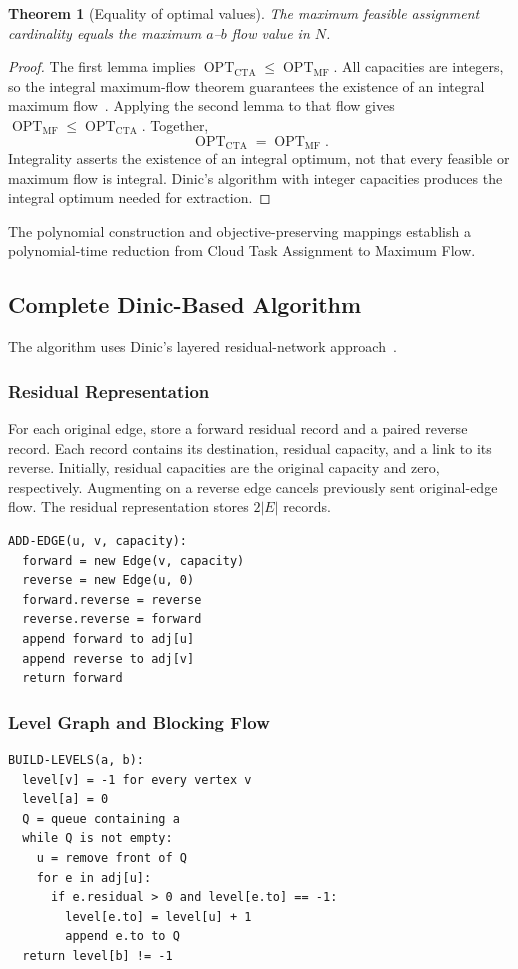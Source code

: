 \documentclass[conference]{IEEEtran}
\newtheorem{theorem}{Theorem}
\theoremstyle{definition}
\theoremstyle{remark}
\newcommand{\OPT}{\operatorname{OPT}}
\begin{document}
\begin{theorem}[Equality of optimal values]
The maximum feasible assignment cardinality equals the maximum $a$--$b$
flow value in $N$.
\end{theorem}
\begin{proof}
The first lemma implies $\OPT_{\mathrm{CTA}}\leq\OPT_{\mathrm{MF}}$.
All capacities are integers, so the integral maximum-flow theorem guarantees
the existence of an integral maximum flow~\cite{ahuja1993}. Applying the second lemma to
that flow gives $\OPT_{\mathrm{MF}}\leq\OPT_{\mathrm{CTA}}$. Together,
\begin{equation}
\boxed{\OPT_{\mathrm{CTA}}=\OPT_{\mathrm{MF}}.}
\end{equation}
Integrality asserts the existence of an integral optimum, not that every
feasible or maximum flow is integral. Dinic's algorithm with integer
capacities produces the integral optimum needed for extraction.
\end{proof}

The polynomial construction and objective-preserving mappings establish a
polynomial-time reduction from Cloud Task Assignment to Maximum Flow.

\subsection{Complete Dinic-Based Algorithm}
The algorithm uses Dinic's layered residual-network approach~\cite{dinic1970}.
\subsubsection{Residual Representation}
For each original edge, store a forward residual record and a paired reverse
record. Each record contains its destination, residual capacity, and a link
to its reverse. Initially, residual capacities are the original capacity
and zero, respectively. Augmenting on a reverse edge cancels previously
sent original-edge flow. The residual representation stores $2|E|$ records.

\begin{lstlisting}[caption={Paired residual-edge insertion.}]
ADD-EDGE(u, v, capacity):
  forward = new Edge(v, capacity)
  reverse = new Edge(u, 0)
  forward.reverse = reverse
  reverse.reverse = forward
  append forward to adj[u]
  append reverse to adj[v]
  return forward
\end{lstlisting}

\subsubsection{Level Graph and Blocking Flow}
\leavevmode\par
\begin{lstlisting}[caption={Breadth-first search of the residual graph.}]
BUILD-LEVELS(a, b):
  level[v] = -1 for every vertex v
  level[a] = 0
  Q = queue containing a
  while Q is not empty:
    u = remove front of Q
    for e in adj[u]:
      if e.residual > 0 and level[e.to] == -1:
        level[e.to] = level[u] + 1
        append e.to to Q
  return level[b] != -1
\end{lstlisting}
\end{document}
